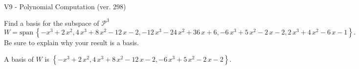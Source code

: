 \begin{exercise}
  \begin{exerciseTitle}V9 - Polynomial Computation (ver. 298)\end{exerciseTitle}
  \begin{exerciseStatement}
    Find a basis for the subspace of \(\mathcal{P}^3\) 
\[W=\mathrm{span}\ \left\{-x^{3} + 2 \, x^{2} , 4 \, x^{3} + 8 \, x^{2} - 12 \, x - 2 , -12 \, x^{3} - 24 \, x^{2} + 36 \, x + 6 , -6 \, x^{3} + 5 \, x^{2} - 2 \, x - 2 , 2 \, x^{3} + 4 \, x^{2} - 6 \, x - 1\right\}.\]
 Be sure to explain why your result is a basis.


  \end{exerciseStatement}
  \begin{exerciseAnswer}
   A basis of \(W\) is  \(\left\{-x^{3} + 2 \, x^{2} , 4 \, x^{3} + 8 \, x^{2} - 12 \, x - 2 , -6 \, x^{3} + 5 \, x^{2} - 2 \, x - 2\right\}\).
  


  \end{exerciseAnswer}
\end{exercise}